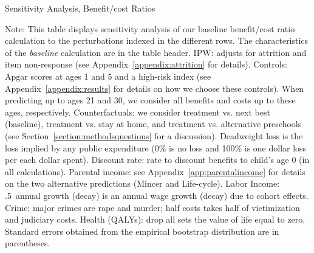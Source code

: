 \begin{table} 
\begin{threeparttable}
\caption{Sensitivity Analysis, Benefit/cost Ratios}
\label{table:bcsens}
\centering 
\footnotesize

\begin{tablenotes}
\footnotesize
\item Note: This table displays sensitivity analysis of our baseline benefit/cost ratio calculation to the perturbations indexed in the different rows. The characteristics of the \textit{baseline} calculation are in the table header. IPW: adjusts for attrition and item non-response (see Appendix~\ref{appendix:attrition} for details). Controls: Apgar scores at ages 1 and 5 and a high-risk index (see Appendix~\ref{appendix:results} for details on how we choose these controls). When predicting up to ages 21 and 30, we consider all benefits and costs up to these ages, respectively. Counterfactuals: we consider treatment vs. next best (baseline), treatment vs. stay at home, and treatment vs. alternative preschools (see Section~\ref{section:methodsquestions} for a discussion). Deadweight loss is the loss implied by any public expenditure (0\% is no loss and 100\% is one dollar loss per each dollar spent). Discount rate: rate to discount benefits to child's age 0 (in all calculations). Parental income: see Appendix~\ref{app:parentalincome} for details on the two alternative predictions (Mincer and Life-cycle). Labor Income: .5\ annual growth (decay) is an annual wage growth (decay) due to cohort effects. Crime: major crimes are rape and murder; half costs takes half of victimization and judiciary costs. Health (QALYs): drop all sets the value of life equal to zero. Standard errors obtained from the empirical bootstrap distribution are in parentheses.
\end{tablenotes}
\end{threeparttable}
\end{table}


